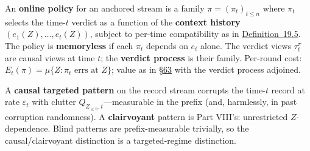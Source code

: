 \begin{thmdef}

An \textbf{online policy} for an anchored stream is a family \(\pi = (\pi_t)_{t \le n}\) where \(\pi_t\) selects the time-\(t\) verdict as a function of the \textbf{context history} \((e_1(Z), \dots, e_t(Z))\), subject to per-time compatibility as in \hyperlink{stmt:19.5}{Definition~19.5}. The policy is \textbf{memoryless} if each \(\pi_t\) depends on \(e_t\) alone. The verdict views \(\tau^\pi_t\) are causal views at time \(t\); the \textbf{verdict process} is their family. Per-round cost: \(E_t(\pi) = \mu\{Z : \pi_t \text{ errs at } Z\}\); value as in \hyperlink{sec:63}{§63} with the verdict process adjoined.
\end{thmdef}

\begin{thmdef}

A \textbf{causal targeted pattern} on the record stream corrupts the time-\(t\) record at rate \(\varepsilon_t\) with clutter \(Q_{Z_{\le t},\, t}\)---\hspace{0pt}measurable in the prefix (and, harmlessly, in past corruption randomness). A \textbf{clairvoyant} pattern is Part VIII's: unrestricted \(Z\)-dependence. Blind patterns are prefix-measurable trivially, so the causal/clairvoyant distinction is a targeted-regime distinction.
\end{thmdef}

